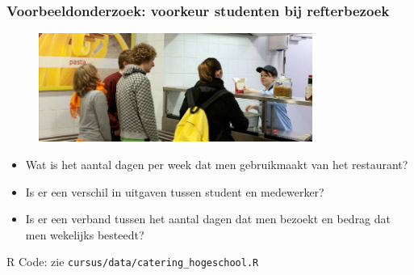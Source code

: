 \documentclass{beamer}
\begin{document}

\begin{frame}
  \frametitle{Voorbeeldonderzoek: voorkeur studenten bij refterbezoek}

  \begin{figure}
    \centering
    \includegraphics[width=0.8\textwidth] {img/students.jpg}
    \label{fig:students}
  \end{figure}

  \begin{itemize}
    \item Wat is het aantal dagen per week dat men gebruikmaakt van het restaurant?
    \item Is er een verschil in uitgaven tussen student en medewerker?
    \item Is er een verband tussen het aantal dagen dat men bezoekt en bedrag dat men wekelijks besteedt?
  \end{itemize}

  R Code: zie \texttt{cursus/data/catering\_hogeschool.R}

\end{frame}
\end{document}
